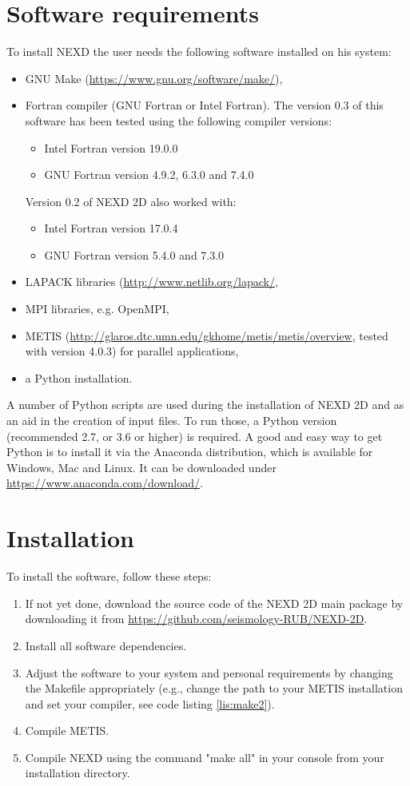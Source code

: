 \section{Software requirements}
\label{sec:softreq}
To install NEXD the user needs the following software installed on his system:
\begin{itemize}
    \item GNU Make (\url{https://www.gnu.org/software/make/}),
    \item Fortran compiler (GNU Fortran or Intel Fortran). The version 0.3 of this software has been tested using the following compiler versions:
		\begin{itemize}
			\item Intel Fortran version 19.0.0
			\item GNU Fortran version 4.9.2, 6.3.0 and 7.4.0
		\end{itemize}
	Version 0.2 of NEXD 2D also worked with:
		\begin{itemize}
			\item Intel Fortran version 17.0.4
			\item GNU Fortran version 5.4.0 and 7.3.0
		\end{itemize}	
    \item LAPACK libraries (\url{http://www.netlib.org/lapack/},
    \item MPI libraries, e.g. OpenMPI, 
    \item METIS (\url{http://glaros.dtc.umn.edu/gkhome/metis/metis/overview}, tested with version 4.0.3) for parallel applications,
    \item a Python installation.
\end{itemize}
 
A number of Python scripts are used during the installation of NEXD 2D and as an aid in the creation of input files. To run those, a Python version (recommended 2.7, or 3.6 or higher) is required. A good and easy way to get Python is to install it via the Anaconda distribution, which is available for Windows, Mac and Linux. It can be downloaded under \url{https://www.anaconda.com/download/}.

\section{Installation}
To install the software, follow these steps:
\begin{enumerate}
    \item If not yet done, download the source code of the NEXD 2D main package by downloading it from \url{https://github.com/seismology-RUB/NEXD-2D}.
    \item Install all software dependencies.
    \item Adjust the software to your system and personal requirements by changing the Makefile appropriately (e.g., change the path to your METIS installation and set your compiler, see code listing \ref{lis:make2}).
    \item Compile METIS.
    \item Compile NEXD using the command "make all" in your console from your installation directory.
\end{enumerate}


